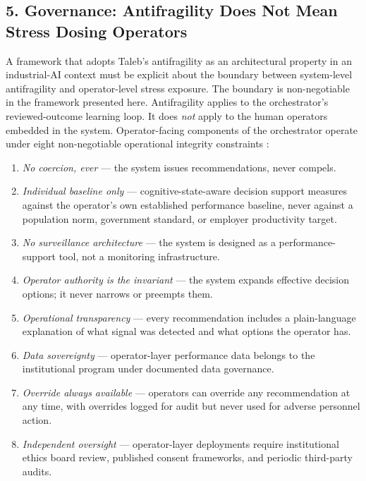 \subsection{5. Governance: Antifragility Does Not Mean Stress Dosing
Operators}\label{governance-antifragility-does-not-mean-stress-dosing-operators}

A framework that adopts Taleb's antifragility as an architectural
property in an industrial-AI context must be explicit about the boundary
between system-level antifragility and operator-level stress exposure.
The boundary is non-negotiable in the framework presented here.
Antifragility applies to the orchestrator's reviewed-outcome learning
loop. It does \emph{not} apply to the human operators embedded in the
system. Operator-facing components of the orchestrator operate under
eight non-negotiable operational integrity constraints \cite{ref5}:

\begin{enumerate}
\def\labelenumi{(\arabic{enumi})}
\tightlist
\item
  \emph{No coercion, ever} --- the system issues recommendations, never
  compels.
\item
  \emph{Individual baseline only} --- cognitive-state-aware decision
  support measures against the operator's own established performance
  baseline, never against a population norm, government standard, or
  employer productivity target.
\item
  \emph{No surveillance architecture} --- the system is designed as a
  performance-support tool, not a monitoring infrastructure.
\item
  \emph{Operator authority is the invariant} --- the system expands
  effective decision options; it never narrows or preempts them.
\item
  \emph{Operational transparency} --- every recommendation includes a
  plain-language explanation of what signal was detected and what
  options the operator has.
\item
  \emph{Data sovereignty} --- operator-layer performance data belongs to
  the institutional program under documented data governance.
\item
  \emph{Override always available} --- operators can override any
  recommendation at any time, with overrides logged for audit but never
  used for adverse personnel action.
\item
  \emph{Independent oversight} --- operator-layer deployments require
  institutional ethics board review, published consent frameworks, and
  periodic third-party audits.
\end{enumerate}

